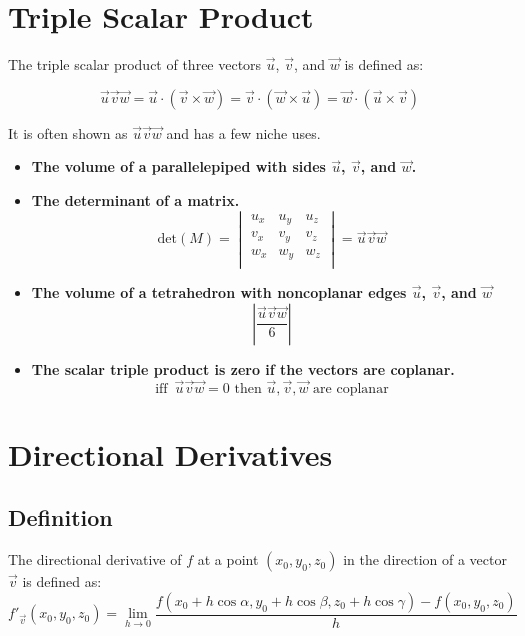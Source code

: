 \documentclass[a4paper,12pt,openany]{book}
\newcommand{\tsp}[3]{
    \vec{#1}\vec{#2}\vec{#3}
}
\newcommand{\abs}[1]{
    \left\vert#1\right\vert
}
\begin{document}
\section{Triple Scalar Product}
The triple scalar product of three vectors \(\vec{u}\), \(\vec{v}\), and \(\vec{w}\) is defined as:

\begin{equation}\label{Triple Scalar Product}
    \tsp{u}{v}{w} = 
    \vec{u} \cdot (\vec{v} \times \vec{w}) = \vec{v} \cdot (\vec{w} \times \vec{u}) = \vec{w} \cdot (\vec{u} \times \vec{v})
\end{equation}

It is often shown as $\tsp{u}{v}{w}$ and has a few niche uses.
\begin{itemize}
    \item \textbf{The volume of a parallelepiped with sides \(\vec{u}\), \(\vec{v}\), and \(\vec{w}\).}
    \item \textbf{The determinant of a matrix.}
    \[\text{det}(M) = 
    \begin{vmatrix}
        u_x & u_y & u_z \\
        v_x & v_y & v_z \\
        w_x & w_y & w_z \\
    \end{vmatrix}
        = \tsp{u}{v}{w}
    \]
    \item \textbf{The volume of a tetrahedron with noncoplanar edges \(\vec{u}\), \(\vec{v}\), and \(\vec{w}\)}
        \[
            \abs{\dfrac{\tsp{u}{v}{w}}{6}}
        \]
    \item \textbf{The scalar triple product is zero if the vectors are coplanar.} 
        \[
            \text{iff }\, \tsp{u}{v}{w} = 0 \text{ then } \vec{u}, \vec{v}, \vec{w} \text{ are coplanar}
        \]
\end{itemize}
\section{Directional Derivatives}
\subsection{Definition}
The directional derivative of \(f\) at a point \((x_0, y_0, z_0)\) in the direction of a vector \(\vec{v}\) is defined as:
\begin{equation}\label{Directional Derivative Definition}
    f'_{\vec{v}}(x_0, y_0, z_0) = 
    \lim_{h \to 0}
    \dfrac{
        f(x_0 + h \cos \alpha, y_0 + h \cos \beta, z_0 + h \cos \gamma) - f(x_0, y_0, z_0)
    }{h}
\end{equation}
\end{document}
